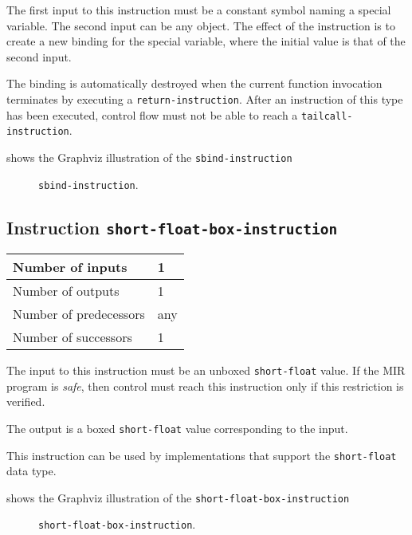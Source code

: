 The first input to this instruction must be a constant symbol naming a
special variable.  The second input can be any object.  The effect of
the instruction is to create a new binding for the special variable,
where the initial value is that of the second input.

The binding is automatically destroyed when the current function
invocation terminates by executing a \texttt{return-instruction}.
After an instruction of this type has been executed, control flow must
not be able to reach a \texttt{tailcall-instruction}. 

 shows the Graphviz illustration of the
\texttt{sbind-instruction}

\begin{figure}
\begin{center}
\end{center}
\caption{\label{fig-sbind-instruction}
\texttt{sbind-instruction}.}
\end{figure}

\subsection{Instruction \texttt{short-float-box-instruction}}
\label{mir-instruction-short-float-box}

\begin{tabular}{|l|l|}
\hline
Number of inputs & 1\\
\hline
Number of outputs & 1\\
\hline
Number of predecessors & any\\
\hline
Number of successors & 1\\
\hline
\end{tabular}

The input to this instruction must be an unboxed \texttt{short-float}
value.  If the MIR program is \emph{safe}, then control must reach
this instruction only if this restriction is verified.

The output is a boxed \texttt{short-float} value corresponding to the
input.

This instruction can be used by implementations that support the
\texttt{short-float} data type.   

 shows the Graphviz illustration of the
\texttt{short-float-box-instruction}

\begin{figure}
\begin{center}
\end{center}
\caption{\label{fig-short-float-box-instruction}
\texttt{short-float-box-instruction}.}
\end{figure}


